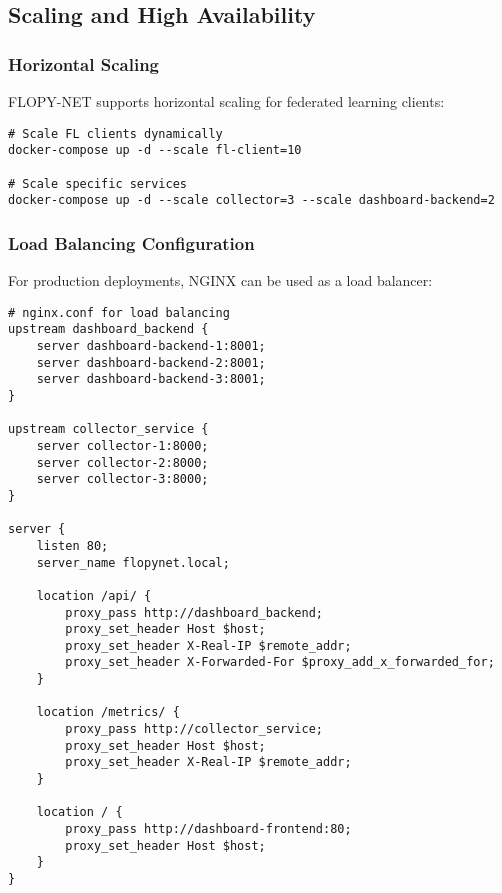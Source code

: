 \subsection{Scaling and High Availability}

\subsubsection{Horizontal Scaling}

FLOPY-NET supports horizontal scaling for federated learning clients:

\begin{lstlisting}[style=dockercode, caption=Docker Compose Scaling]
# Scale FL clients dynamically
docker-compose up -d --scale fl-client=10

# Scale specific services
docker-compose up -d --scale collector=3 --scale dashboard-backend=2
\end{lstlisting}

\subsubsection{Load Balancing Configuration}

For production deployments, NGINX can be used as a load balancer:

\begin{lstlisting}[style=dockercode, caption=NGINX Load Balancer Configuration]
# nginx.conf for load balancing
upstream dashboard_backend {
    server dashboard-backend-1:8001;
    server dashboard-backend-2:8001;
    server dashboard-backend-3:8001;
}

upstream collector_service {
    server collector-1:8000;
    server collector-2:8000;
    server collector-3:8000;
}

server {
    listen 80;
    server_name flopynet.local;

    location /api/ {
        proxy_pass http://dashboard_backend;
        proxy_set_header Host $host;
        proxy_set_header X-Real-IP $remote_addr;
        proxy_set_header X-Forwarded-For $proxy_add_x_forwarded_for;
    }

    location /metrics/ {
        proxy_pass http://collector_service;
        proxy_set_header Host $host;
        proxy_set_header X-Real-IP $remote_addr;
    }

    location / {
        proxy_pass http://dashboard-frontend:80;
        proxy_set_header Host $host;
    }
}
\end{lstlisting}

